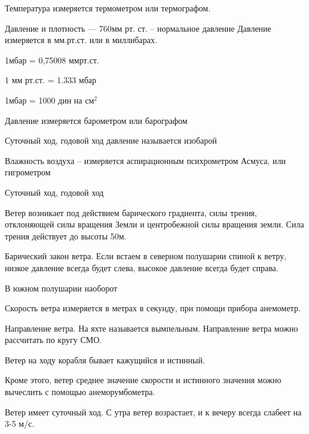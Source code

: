 \documentclass{article}        %
\begin{document}
Температура измеряется термометром или термографом.

Давление и плотность --- 760мм рт. ст. -- нормальное давление
Давление измеряется в мм.рт.ст. или в миллибарах.

1мбар = 0,75008 ммрт.ст.

1 мм рт.ст. = 1.333 мбар

1мбар = 1000 дин на $см^2$

Давление измеряется барометром или барографом

Суточный ход, годовой ход давление называется изобарой


Влажность воздуха -- измеряется аспирационным психрометром Асмуса, или гигрометром

Суточный ход, годовой ход

Ветер возникает под действием барического градиента, силы трения, отклоняющей силы вращения 
Земли и центробежной силы вращения земли. Сила трения действует до высоты 50м.

Барический закон ветра. Если встаем в северном полушарии спиной к ветру, 
низкое давление всегда будет слева, высокое давление всегда будет справа.

В южном полушарии наоборот


Скорость ветра измеряется в метрах в секунду, при помощи прибора анемометр.

Направление ветра. На яхте называется вымпельным. Направление ветра можно рассчитать по кругу СМО. 

Ветер на ходу корабля бывает кажущийся и истинный.

Кроме этого, ветер среднее значение скорости и истинного значения можно вычеслить с помощью анеморумбометра.

Ветер имеет суточный ход. С утра ветер возрастает, и к вечеру всегда слабеет на 3-5 м/с.
\end{document}
